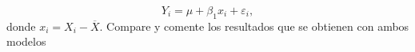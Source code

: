 \documentclass[10.5pt,notitlepage]{article}
\newcommand{\ee}{\varepsilon}
\begin{document}
\[
Y_i = \mu + \beta_1 x_i + \ee_i,
\]
donde \(x_i = X_i - \overline{X}\). Compare y comente los resultados que se obtienen con ambos modelos
\begin{table}[htb]
    \centering
    \caption{Datos Rendimiento de Soya.}
    \label{tab:soya}
\end{table}
\end{document}
